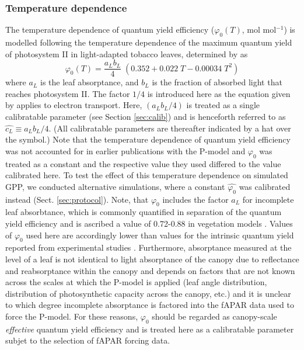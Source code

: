 \documentclass[gmd, manuscript]{copernicus}
\begin{document}
\subsubsection{Temperature dependence}
\label{sec:tempstress}
The temperature dependence of quantum yield efficiency ($\varphi_0(T)$, mol mol$^{-1}$) is modelled following the temperature dependence of the maximum quantum yield of photosystem II in light-adapted tobacco leaves, determined by \citet{bernacchi03pce} as 
\begin{equation}
\label{eq:bernacchi03}
\varphi_0(T) = \frac{a_L b_L}{4} \; ( 0.352 + 0.022\;T - 0.00034\;T^2 )
\end{equation}
where $a_L$ is the leaf absorptance, and $b_L$ is the fraction of absorbed light that reaches photosystem II. The factor $1/4$ is introduced here as the equation given by \citet{bernacchi03pce} applies to electron transport. Here, $(a_L b_L / 4)$ is treated as a single calibratable parameter (see Section \ref{sec:calib}) and is henceforth referred to as $\widehat{c_L}\equiv a_L b_L / 4$. (All calibratable parameters are thereafter indicated by a hat over the symbol.) Note that the temperature dependence of quantum yield efficiency was not accounted for in earlier publications with the P-model \citep{keenan17natcomm, wang17natpl} and $\varphi_0$ was treated as a constant and the respective value they used differed to the value calibrated here. To test the effect of this temperature dependence on simulated GPP, we conducted alternative simulations, where a constant $\widehat{\varphi_0}$ was calibrated instead (Sect. \ref{sec:protocol}). Note, that $\varphi_0$ includes the factor $a_L$ for incomplete leaf absorbtance, which is commonly quantified in separation of the quantum yield efficiency and is ascribed a value of 0.72-0.88 in vegetation models \citep{rogers17}. Values of $\varphi_0$ used here are accordingly lower than values for the intrinsic quantum yield reported from experimental studies \citep{long93, singsaas01}. Furthermore, absorptance measured at the level of a leaf is not identical to light absorptance of the canopy  due to reflectance and reabsorptance within the canopy and depends on factors that are not known across the scales at which the P-model is applied (leaf angle distribution, distribution of photosynthetic capacity across the canopy, etc.) and it is unclear to which degree incomplete absorptance is factored into the fAPAR data used to force the P-model. For these reasons, $\varphi_0$ should be regarded as canopy-scale \textit{effective} quantum yield efficiency and is treated here as a calibratable parameter subjet to the selection of fAPAR forcing data. 
\end{document}
